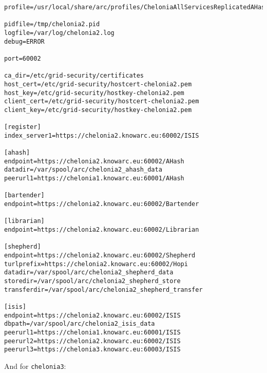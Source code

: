 \documentclass{article}
\begin{document}
\begin{verbatim}
profile=/usr/local/share/arc/profiles/CheloniaAllServicesReplicatedAHashWithISIS.xml

pidfile=/tmp/chelonia2.pid
logfile=/var/log/chelonia2.log
debug=ERROR

port=60002

ca_dir=/etc/grid-security/certificates
host_cert=/etc/grid-security/hostcert-chelonia2.pem
host_key=/etc/grid-security/hostkey-chelonia2.pem
client_cert=/etc/grid-security/hostcert-chelonia2.pem
client_key=/etc/grid-security/hostkey-chelonia2.pem

[register]
index_server1=https://chelonia2.knowarc.eu:60002/ISIS

[ahash]
endpoint=https://chelonia2.knowarc.eu:60002/AHash
datadir=/var/spool/arc/chelonia2_ahash_data
peerurl1=https://chelonia1.knowarc.eu:60001/AHash

[bartender]
endpoint=https://chelonia2.knowarc.eu:60002/Bartender

[librarian]
endpoint=https://chelonia2.knowarc.eu:60002/Librarian

[shepherd]
endpoint=https://chelonia2.knowarc.eu:60002/Shepherd
turlprefix=https://chelonia2.knowarc.eu:60002/Hopi
datadir=/var/spool/arc/chelonia2_shepherd_data
storedir=/var/spool/arc/chelonia2_shepherd_store
transferdir=/var/spool/arc/chelonia2_shepherd_transfer

[isis]
endpoint=https://chelonia2.knowarc.eu:60002/ISIS
dbpath=/var/spool/arc/chelonia2_isis_data
peerurl1=https://chelonia1.knowarc.eu:60001/ISIS
peerurl2=https://chelonia2.knowarc.eu:60002/ISIS
peerurl3=https://chelonia3.knowarc.eu:60003/ISIS
\end{verbatim}

And for \verb!chelonia3!:
\end{document}
